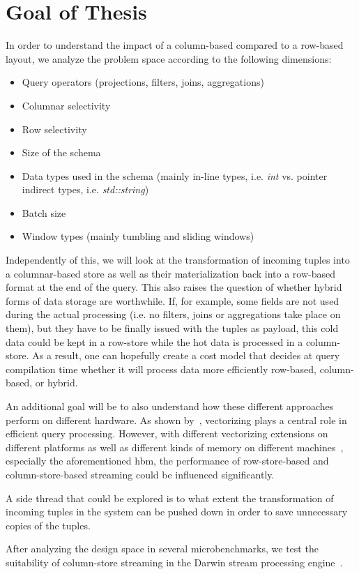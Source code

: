 \section{Goal of Thesis}
\label{sec:goal}

In order to understand the impact of a column-based compared to a row-based layout, we analyze the problem space according to the following dimensions:
\begin{itemize}
    \item Query operators (projections, filters, joins, aggregations)
    \item Columnar selectivity
    \item Row selectivity
    \item Size of the schema
    \item Data types used in the schema (mainly in-line types, i.e. \emph{int} vs. pointer indirect types, i.e. \emph{std::string})
    \item Batch size
    \item Window types (mainly tumbling and sliding windows)
\end{itemize}

Independently of this, we will look at the transformation of incoming tuples into a columnar-based store as well as their materialization back into a row-based format at the end of the query.
This also raises the question of whether hybrid forms of data storage are worthwhile.
If, for example, some fields are not used during the actual processing (i.e. no filters, joins or aggregations take place on them), but they have to be finally issued with the tuples as payload, this cold data could be kept in a row-store while the hot data is processed in a column-store. 
As a  result, one can hopefully create a cost model that decides at query compilation time whether it will process data more efficiently row-based, column-based, or hybrid.

An additional goal will be to also understand how these different approaches perform on different hardware.
As shown by~\citet{DBLP:journals/pvldb/KerstenLKNPB18}, vectorizing plays a central role in efficient query processing.
However, with different vectorizing extensions on different platforms as well as different kinds of memory on different machines~\cite[]{bollmeier2021processor}, especially the aforementioned \ac{hbm}, the performance of row-store-based and column-store-based streaming could be influenced significantly.

A side thread that could be explored is to what extent the transformation of incoming tuples in the system can be pushed down in order to save unnecessary copies of the tuples.

After analyzing the design space in several microbenchmarks, we test the suitability of column-store streaming in the Darwin stream processing engine~\cite[]{DBLP:conf/cidr/BensonR22}.